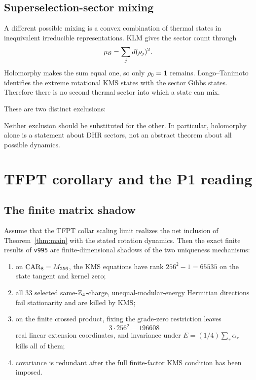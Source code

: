 \subsection{Superselection-sector mixing}

A different possible mixing is a convex combination of thermal
states in inequivalent irreducible representations.  KLM gives the
sector count through
\[
 \mu_{\mathcal B}=\sum_jd(\rho_j)^2.
\]
Holomorphy makes the sum equal one, so only $\rho_0=\mathbf 1$ remains.
Longo--Tanimoto identifies the extreme rotational KMS states with
the sector Gibbs states.  Therefore there is no second thermal
sector into which a state can mix.

These are two distinct exclusions:
\begin{center}
\setlength{\fboxsep}{7pt}
\end{center}
Neither exclusion should be substituted for the other.  In
particular, holomorphy alone is a statement about DHR sectors, not
an abstract theorem about all possible dynamics.

\section{TFPT corollary and the P1 reading}

\subsection{The finite matrix shadow}

\begin{corollary}
\label{cor:v995}
Assume that the TFPT collar scaling limit realizes the net inclusion
of Theorem~\ref{thm:main} with the stated rotation dynamics.  Then
the exact finite results of \texttt{v995} are finite-dimensional
shadows of the two uniqueness mechanisms:
\begin{enumerate}[label=\textup{(\roman*)}]
\item on $\operatorname{CAR}_8=M_{256}$, the KMS equations have rank
  $256^2-1=65535$ on the state tangent and kernel zero;
\item all $33$ selected same-$\mathbb Z_4$-charge, unequal-modular-energy
  Hermitian directions fail stationarity and are killed by KMS;
\item on the finite crossed product, fixing the grade-zero
  restriction leaves
  \[
    3\cdot256^2=196608
  \]
  real linear extension coordinates, and invariance under
  $E=(1/4)\sum_r\alpha_r$ kills all of them;
\item covariance is redundant after the full finite-factor KMS
  condition has been imposed.
\end{enumerate}
\end{corollary}

